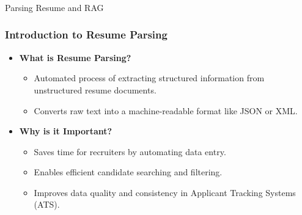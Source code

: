 \begin{frame}[fragile]\frametitle{}
\begin{center}
{\Large Parsing Resume and RAG}

\end{center}
\end{frame}

\begin{frame}[fragile]\frametitle{Introduction to Resume Parsing}
    \begin{itemize}
        \item \textbf{What is Resume Parsing?}
        \begin{itemize}
            \item Automated process of extracting structured information from unstructured resume documents.
            \item Converts raw text into a machine-readable format like JSON or XML.
        \end{itemize}
        \item \textbf{Why is it Important?}
        \begin{itemize}
            \item Saves time for recruiters by automating data entry.
            \item Enables efficient candidate searching and filtering.
            \item Improves data quality and consistency in Applicant Tracking Systems (ATS).
        \end{itemize}
    \end{itemize}
\end{frame}

